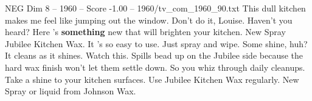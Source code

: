 \begin{textsample}{NEG Dim 8 – 1960 – Score -1.00 – 1960/tv\_com\_1960\_90.txt}  \label{ex:f8_neg_037}
This dull kitchen makes me feel like jumping out the window.
Don't do it, Louise.
Haven't you heard?
Here 's \textbf{something} new that will brighten your kitchen.
New Spray Jubilee Kitchen Wax.
It 's so easy to use.
Just spray and wipe.
Some shine, huh?
It cleans as it shines.
Watch this.
Spills bead up on the Jubilee side because the hard wax finish won't let them settle down.
So you whiz through daily cleanups.
Take a shine to your kitchen surfaces.
Use Jubilee Kitchen Wax regularly.
New Spray or liquid from Johnson Wax.

\end{textsample}
